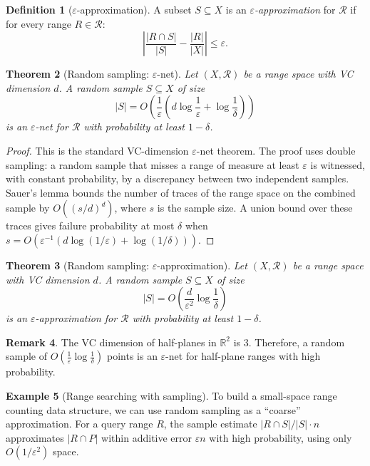 \documentclass[twoside,12pt]{book}
\theoremstyle{plain}
\newtheorem{theorem}{Theorem}[chapter]
\theoremstyle{definition}
\newtheorem{definition}[theorem]{Definition}
\newtheorem{example}[theorem]{Example}
\newtheorem{remark}[theorem]{Remark}
\theoremstyle{remark}
\begin{document}
\begin{definition}[$\varepsilon$-approximation]
A subset $S \subseteq X$ is an \emph{$\varepsilon$-approximation} for $\mathcal{R}$ if for every range $R \in \mathcal{R}$:
\[
\left| \frac{|R \cap S|}{|S|} - \frac{|R|}{|X|} \right| \leq \varepsilon.
\]
\end{definition}

\begin{theorem}[Random sampling: $\varepsilon$-net]
\label{thm:eps-net}
Let $(X, \mathcal{R})$ be a range space with VC dimension $d$. A random sample $S \subseteq X$ of size
\[
|S| = O\!\left(\frac{1}{\varepsilon} \left(d \log \frac{1}{\varepsilon} + \log \frac{1}{\delta}\right)\right)
\]
is an $\varepsilon$-net for $\mathcal{R}$ with probability at least $1 - \delta$.
\end{theorem}

\begin{proof}
This is the standard VC-dimension $\varepsilon$-net theorem. The proof uses
double sampling: a random sample that misses a range of measure at least
$\varepsilon$ is witnessed, with constant probability, by a discrepancy
between two independent samples. Sauer's lemma bounds the number of traces of
the range space on the combined sample by
$O((s/d)^d)$, where $s$ is the sample size. A union bound over these traces
gives failure probability at most $\delta$ when
$s=O(\varepsilon^{-1}(d\log(1/\varepsilon)+\log(1/\delta)))$.
\end{proof}

\begin{theorem}[Random sampling: $\varepsilon$-approximation]
\label{thm:eps-approx}
Let $(X, \mathcal{R})$ be a range space with VC dimension $d$. A random sample $S \subseteq X$ of size
\[
|S| = O\!\left(\frac{d}{\varepsilon^2} \log \frac{1}{\delta}\right)
\]
is an $\varepsilon$-approximation for $\mathcal{R}$ with probability at least $1 - \delta$.
\end{theorem}

\begin{remark}
The VC dimension of half-planes in $\mathbb{R}^2$ is 3. Therefore, a random sample of $O(\frac{1}{\varepsilon} \log \frac{1}{\delta})$ points is an $\varepsilon$-net for half-plane ranges with high probability.
\end{remark}

\begin{example}[Range searching with sampling]
To build a small-space range counting data structure, we can use random sampling as a ``coarse'' approximation. For a query range $R$, the sample estimate $|R \cap S| / |S| \cdot n$ approximates $|R \cap P|$ within additive error $\varepsilon n$ with high probability, using only $O(1/\varepsilon^2)$ space.
\end{example}
\end{document}
